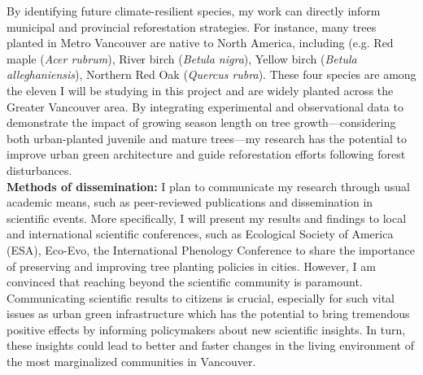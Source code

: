 \documentclass[11pt,letter]{article}
\begin{document}
\par 
By identifying future climate-resilient species, my work can directly inform municipal and provincial reforestation strategies. For instance, many trees planted in Metro Vancouver are native to North America, including (e.g. Red maple (\textit{Acer rubrum}), River birch (\textit{Betula nigra}), Yellow birch (\textit{Betula alleghaniensis}), Northern Red Oak (\textit{Quercus rubra}). These four species are among the eleven I will be studying in this project and are widely planted across the Greater Vancouver area. By integrating experimental and observational data to demonstrate the impact of growing season length on tree growth—considering both urban-planted juvenile and mature trees—my research has the potential to improve urban green architecture and guide reforestation efforts following forest disturbances.\\
\textbf{Methods of dissemination:} I plan to communicate my research through usual academic means, such as peer-reviewed publications and dissemination in scientific events. More specifically, I will present my results and findings to local and international scientific conferences, such as Ecological Society of America (ESA), Eco-Evo, the International Phenology Conference to share the importance of preserving and improving tree planting policies in cities. However, I am convinced that reaching beyond the scientific community is paramount. Communicating scientific results to citizens is crucial, especially for such vital issues as urban green infrastructure which has the potential to bring tremendous positive effects by informing policymakers about new scientific insights. In turn, these insights could lead to better and faster changes in the living environment of the most marginalized communities in Vancouver.
\end{document}
